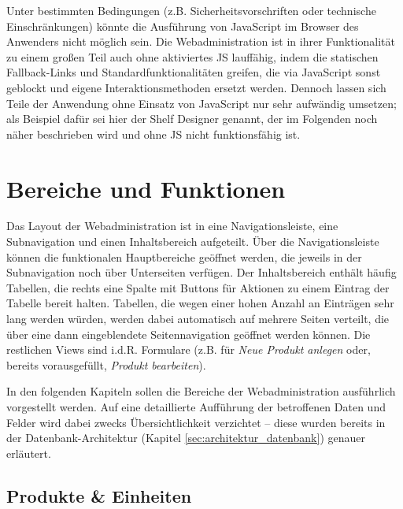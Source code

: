 Unter bestimmten Bedingungen (z.B. Sicherheitsvorschriften oder technische Einschränkungen) könnte die Ausführung von JavaScript im Browser des Anwenders nicht möglich sein. Die Webadministration ist in ihrer Funktionalität zu einem großen Teil auch ohne aktiviertes \acs{JS} lauffähig, indem die statischen Fallback-Links und Standardfunktionalitäten greifen, die via JavaScript sonst geblockt und eigene Interaktionsmethoden ersetzt werden. Dennoch lassen sich Teile der Anwendung ohne Einsatz von JavaScript nur sehr aufwändig umsetzen; als Beispiel dafür sei hier der Shelf Designer genannt, der im Folgenden noch näher beschrieben wird und ohne \acs{JS} nicht funktionsfähig ist.


\section{Bereiche und Funktionen}

Das Layout der Webadministration ist in eine Navigationsleiste, eine Subnavigation und einen Inhaltsbereich aufgeteilt. Über die Navigationsleiste können die funktionalen Hauptbereiche geöffnet werden, die jeweils in der Subnavigation noch über Unterseiten verfügen. Der Inhaltsbereich enthält häufig Tabellen, die rechts eine Spalte mit Buttons für Aktionen zu einem Eintrag der Tabelle bereit halten. Tabellen, die wegen einer hohen Anzahl an Einträgen sehr lang werden würden, werden dabei automatisch auf mehrere Seiten verteilt, die über eine dann eingeblendete Seitennavigation geöffnet werden können. Die restlichen Views sind i.d.R. Formulare (z.B. für \emph{Neue Produkt anlegen} oder, bereits vorausgefüllt, \emph{Produkt bearbeiten}).

In den folgenden Kapiteln sollen die Bereiche der Webadministration ausführlich vorgestellt werden. Auf eine detaillierte Aufführung der betroffenen Daten und Felder wird dabei zwecks Übersichtlichkeit verzichtet -- diese wurden bereits in der Datenbank-Architektur (Kapitel \ref{sec:architektur_datenbank}) genauer erläutert.

\subsection{Produkte \& Einheiten}

